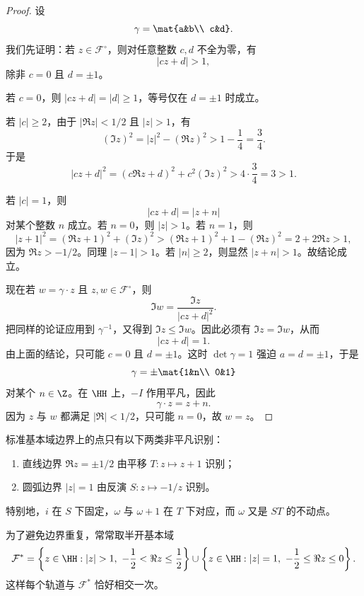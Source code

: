 \begin{proof}
设
\[
\gamma=\mat{a&b\\ c&d}.
\]
我们先证明：若 $z\in\mathcal F^\circ$，则对任意整数 $c,d$ 不全为零，有
\[
|cz+d|>1,
\]
除非 $c=0$ 且 $d=\pm 1$。

若 $c=0$，则 $|cz+d|=|d|\ge 1$，等号仅在 $d=\pm1$ 时成立。

若 $|c|\ge 2$，由于 $|\Re z|<1/2$ 且 $|z|>1$，有
\[
(\Im z)^2=|z|^2-(\Re z)^2>1-\frac14=\frac34.
\]
于是
\[
|cz+d|^2=(c\Re z+d)^2+c^2(\Im z)^2>4\cdot \frac34=3>1.
\]

若 $|c|=1$，则
\[
|cz+d|=|z+n|
\]
对某个整数 $n$ 成立。若 $n=0$，则 $|z|>1$。若 $n=1$，则
\[
|z+1|^2=(\Re z+1)^2+(\Im z)^2
> (\Re z+1)^2+1-(\Re z)^2
=2+2\Re z>1,
\]
因为 $\Re z>-1/2$。同理 $|z-1|>1$。若 $|n|\ge 2$，则显然 $|z+n|>1$。故结论成立。

现在若 $w=\gamma\cdot z$ 且 $z,w\in\mathcal F^\circ$，则
\[
\Im w=\frac{\Im z}{|cz+d|^2}.
\]
把同样的论证应用到 $\gamma^{-1}$，又得到 $\Im z\le \Im w$。因此必须有 $\Im z=\Im w$，从而
\[
|cz+d|=1.
\]
由上面的结论，只可能 $c=0$ 且 $d=\pm1$。这时 $\det\gamma=1$ 强迫 $a=d=\pm1$，于是
\[
\gamma=\pm\mat{1&n\\ 0&1}
\]
对某个 $n\in\Z$。在 $\HH$ 上，$-I$ 作用平凡，因此
\[
\gamma\cdot z=z+n.
\]
因为 $z$ 与 $w$ 都满足 $|\Re|<1/2$，只可能 $n=0$，故 $w=z$。
\end{proof}

\begin{corollary}
标准基本域边界上的点只有以下两类非平凡识别：
\begin{enumerate}
  \item 直线边界 $\Re z=\pm 1/2$ 由平移 $T:z\mapsto z+1$ 识别；
  \item 圆弧边界 $|z|=1$ 由反演 $S:z\mapsto -1/z$ 识别。
\end{enumerate}
特别地，$i$ 在 $S$ 下固定，$\omega$ 与 $\omega+1$ 在 $T$ 下对应，而 $\omega$ 又是 $ST$ 的不动点。
\end{corollary}

\begin{remark}
为了避免边界重复，常常取半开基本域
\[
\mathcal F^{\ast}=
\left\{z\in\HH:|z|>1,\ -\frac12<\Re z\le \frac12\right\}
\cup
\left\{z\in\HH:|z|=1,\ -\frac12\le \Re z\le 0\right\}.
\]
这样每个轨道与 $\mathcal F^{\ast}$ 恰好相交一次。
\end{remark}

